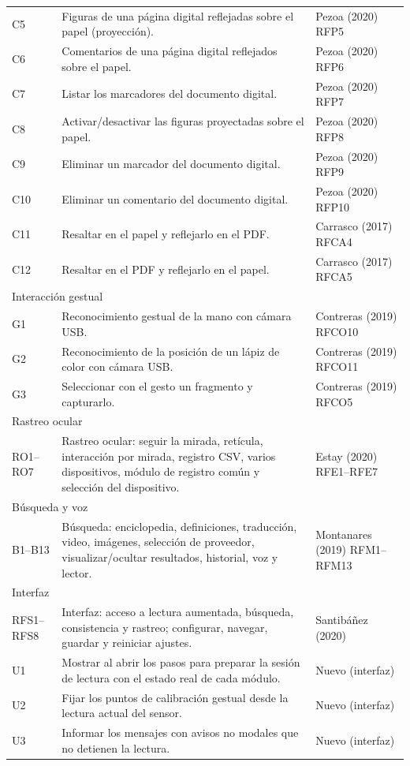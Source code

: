 \begin{longtable}{p{2.1cm} p{8.6cm} p{3.6cm}}
C5 & Figuras de una página digital reflejadas sobre el papel (proyección). & Pezoa (2020) RFP5 \\
C6 & Comentarios de una página digital reflejados sobre el papel. & Pezoa (2020) RFP6 \\
C7 & Listar los marcadores del documento digital. & Pezoa (2020) RFP7 \\
C8 & Activar/desactivar las figuras proyectadas sobre el papel. & Pezoa (2020) RFP8 \\
C9 & Eliminar un marcador del documento digital. & Pezoa (2020) RFP9 \\
C10 & Eliminar un comentario del documento digital. & Pezoa (2020) RFP10 \\
C11 & Resaltar en el papel y reflejarlo en el PDF. & Carrasco (2017) RFCA4 \\
C12 & Resaltar en el PDF y reflejarlo en el papel. & Carrasco (2017) RFCA5 \\
\midrule
\multicolumn{3}{l}{Interacción gestual} \\
G1 & Reconocimiento gestual de la mano con cámara USB. & Contreras (2019) RFCO10 \\
G2 & Reconocimiento de la posición de un lápiz de color con cámara USB. & Contreras (2019) RFCO11 \\
G3 & Seleccionar con el gesto un fragmento y capturarlo. & Contreras (2019) RFCO5 \\
\midrule
\multicolumn{3}{l}{Rastreo ocular} \\
RO1–RO7 & Rastreo ocular: seguir la mirada, retícula, interacción por mirada, registro CSV, varios dispositivos, módulo de registro común y selección del dispositivo. & Estay (2020) RFE1–RFE7 \\
\midrule
\multicolumn{3}{l}{Búsqueda y voz} \\
B1–B13 & Búsqueda: enciclopedia, definiciones, traducción, video, imágenes, selección de proveedor, visualizar/ocultar resultados, historial, voz y lector. & Montanares (2019) RFM1–RFM13 \\
\midrule
\multicolumn{3}{l}{Interfaz} \\
RFS1–RFS8 & Interfaz: acceso a lectura aumentada, búsqueda, consistencia y rastreo; configurar, navegar, guardar y reiniciar ajustes. & Santibáñez (2020) \\
U1 & Mostrar al abrir los pasos para preparar la sesión de lectura con el estado real de cada módulo. & Nuevo (interfaz) \\
U2 & Fijar los puntos de calibración gestual desde la lectura actual del sensor. & Nuevo (interfaz) \\
U3 & Informar los mensajes con avisos no modales que no detienen la lectura. & Nuevo (interfaz) \\
\end{longtable}
